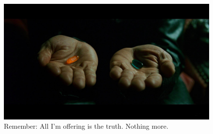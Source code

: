 \begin{figure}
  \includegraphics{assets/images/bitcoin-orange-pill.jpg}
  \caption*{Remember: All I'm offering is the truth. Nothing more.}
  \label{fig:bitcoin-orange-pill}
\end{figure}

%
%
%
